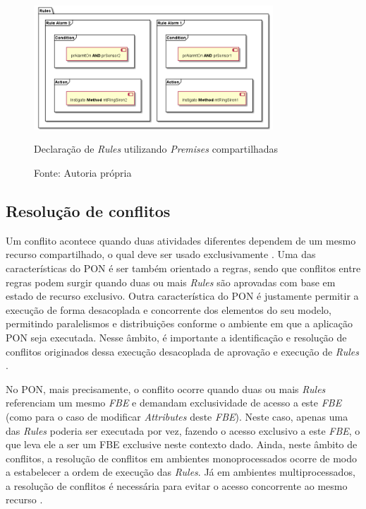 \begin{figure}[!htb]
  \centering
  \includegraphics[width=0.8\textwidth]{../out/diagrams/rules_example/rules.png}
  \smallskip
  \caption{Declaração de \textit{Rules} utilizando \textit{Premises}
    compartilhadas}
  \caption*{Fonte: Autoria própria}
  \label{fig:rules_shared_ex}
\end{figure}

\subsection{Resolução de conflitos}\label{sec:conflitos}

Um conflito acontece quando duas atividades diferentes dependem de um mesmo
recurso compartilhado, o qual deve ser usado exclusivamente
\cite{doc_simao_2005}. Uma das características do PON é ser também orientado a
regras, sendo que conflitos entre regras podem surgir quando duas ou mais
\textit{Rules} são aprovadas com base em estado de recurso exclusivo. Outra
característica do PON é justamente permitir a execução de forma desacoplada e
concorrente dos elementos do seu modelo, permitindo paralelismos e distribuições
conforme o ambiente em que a aplicação PON seja executada. Nesse âmbito, é
importante a identificação e resolução de conflitos originados dessa execução
desacoplada de aprovação e execução de \textit{Rules} \cite{msc_pordeus_2017}.

No PON, mais precisamente, o conflito ocorre quando duas ou mais \textit{Rules}
referenciam um mesmo \textit{FBE} e demandam exclusividade de acesso a este
\textit{FBE} (como para o caso de modificar \textit{Attributes} deste
\textit{FBE}). Neste caso, apenas uma das \textit{Rules} poderia ser executada
por vez, fazendo o acesso exclusivo a este \textit{FBE}, o que leva ele a ser um
FBE exclusive neste contexto dado. Ainda, neste âmbito de conflitos, a resolução
de conflitos em ambientes monoprocessados ocorre de modo a estabelecer a ordem
de execução das \textit{Rules}. Já em ambientes multiprocessados, a resolução de
conflitos é necessária para evitar o acesso concorrente ao mesmo recurso
\cite{msc_valenca_2012,msc_Banaszewski_2009}.

